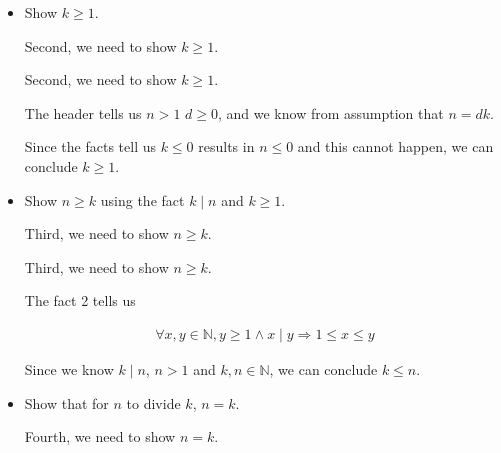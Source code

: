 \documentclass[12pt]{article}
\begin{document}
\begin{enumerate}[a.]
\begin{mdframed}
\begin{enumerate}[1.]
\begin{itemize}
            \item Show $k \geq 1$.

            \bigskip

            Second, we need to show $k \geq 1$.

            \bigskip

            \begin{mdframed}
            Second, we need to show $k \geq 1$.

            \bigskip

            The header tells us $n > 1$ $d \geq 0$, and we know from
            assumption that $n = dk$.

            \bigskip

            Since the facts tell us $k \leq 0$ results in $n \leq 0$ and this
            cannot happen, we can conclude $k \geq 1$.

            \end{mdframed}

            \item Show $n \geq k$ using the fact $k \mid n$ and $k \geq 1$.

            \bigskip

            Third, we need to show $n \geq k$.

            \bigskip

            \begin{mdframed}
            \bigskip

            Third, we need to show $n \geq k$.

            \bigskip

            The fact 2 tells us

            \begin{align}
                \forall x,y \in \mathbb{N}, y \geq 1 \land x \mid y \Rightarrow 1 \leq x \leq y
            \end{align}

            \bigskip

            Since we know $k \mid n$, $n > 1$ and $k,n \in \mathbb{N}$, we can conclude
            $k \leq n$.

            \end{mdframed}

            \item Show that for $n$ to divide $k$, $n = k$.

            \bigskip

            Fourth, we need to show $n = k$.


\end{itemize}
\end{enumerate}
\end{mdframed}
\end{enumerate}
\end{document}
